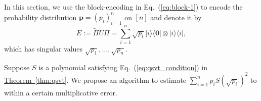 \documentclass[journal]{IEEEtran}
\newcommand{\eq}[1]{Eq.~(\ref{eq:#1})}
\newcommand{\thm}[1]{\hyperref[thm:#1]{Theorem~\ref*{thm:#1}}}
\begin{document}

In this section, we use the block-encoding in \eq{block-1} to encode the probability distribution $\mathbf{p} = (p_i)_{i=1}^n$ on $[n]$ and denote it by 
\begin{equation}
  \label{eq:def_E}
E := \widetilde{\Pi } U \Pi=\sum_{i=1}^{n}\sqrt{p_{i}}|i\rangle \langle \mathbf{0}|\otimes |i\rangle \langle i|,
\end{equation}
which has singular values $\sqrt{p_{1}}, \ldots, \sqrt{p_{n}}$.

Suppose $S$ is a polynomial satisfying \eq{qsvt_condition} in \thm{qsvt}.
We propose an algorithm to estimate $\sum_{i=1}^n p_i S(\sqrt{p_i})^2$ to within a certain multiplicative error.
\end{document}
